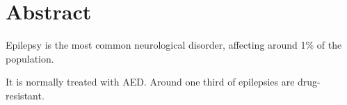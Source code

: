 \chapter{Abstract}


Epilepsy is the most common neurological disorder, affecting around 1\% of the population.

It is normally treated with \acl{AED}.
Around one third of epilepsies are drug-resistant.





